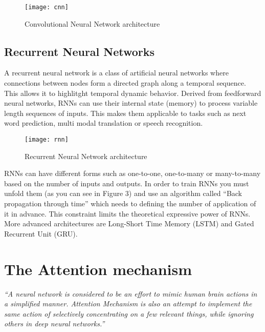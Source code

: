 \documentclass[11pt]{article}
\begin{document}
\begin{figure}[h]
\centerline{\texttt{[image: cnn]}}
\caption{Convolutional Neural Network architecture} 
\label{fig}
\end{figure}

\subsection{Recurrent Neural Networks}
A recurrent neural network is a class of artificial neural networks where connections between nodes form a directed graph along a temporal sequence. This allows it to highlitght temporal dynamic behavior. Derived from feedforward neural networks, RNNs can use their internal state (memory) to process variable length sequences of inputs. This makes them applicable to tasks such as next word prediction, multi modal translation or speech recognition.  

\begin{figure}[h]
\centerline{\texttt{[image: rnn]}}
\caption{Recurrent Neural Network architecture} 
\label{fig}
\end{figure}

\noindent RNNs can have different forms such as one-to-one, one-to-many or many-to-many based on the number of inputs and outputs. In order to train RNNs you must unfold them (as you can see in Figure 3) and use an algorithm called ``Back propagation through time'' which needs to defining the number of application of it in advance. This constraint limits the theoretical expressive power of RNNs. More advanced architectures are Long-Short Time Memory (LSTM) and Gated Recurrent Unit (GRU). 

\newpage
\section{The Attention mechanism} 
\begin{center}
\emph{``A neural network is considered to be an effort to mimic human brain actions in a simplified manner. Attention Mechanism is also an attempt to implement the same action of selectively concentrating on a few relevant things, while ignoring others in deep neural networks.''}
\end{center}
\end{document}
